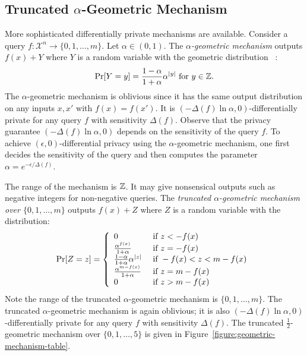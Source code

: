 \subsection{Truncated $\alpha$-Geometric Mechanism}\label{subsec:geometric}
More sophisticated differentially private mechanisms are
available. Consider a query
$f : \mathcal{X}^n \rightarrow \{ 0, 1, \ldots, m \}$. Let $\alpha \in (0, 1)$.
The \emph{$\alpha$-geometric mechanism}
outputs $f(x) + Y$ where $Y$ is a random variable with the geometric
distribution~\cite{GRS:09:UUPM,GRS:12:UUPM} :
\[
\Pr[Y = y] = \frac{1 - \alpha}{1 + \alpha}\alpha^{|y|}
\textmd{ for } y \in \mathbb{Z}.
\]
The $\alpha$-geometric mechanism is oblivious since it has the same
output distribution on any inputs $x, x'$ with $f (x) = f
(x')$. It is $(- {\Delta (f)} \ln \alpha, 0)$-differentially
private for any query $f$ with sensitivity $\Delta (f)$. Observe that
the privacy guarantee $(-{\Delta (f)} \ln \alpha, 0)$ depends on the
sensitivity of the query $f$. To achieve $(\epsilon, 0)$-differential
privacy using the $\alpha$-geometric mechanism, one first decides the
sensitivity of the query and then computes the parameter $\alpha =
e^{-{\epsilon}/{{\Delta (f)}}}$. 

The range of the mechanism is $\mathbb{Z}$. It may give nonsensical
outputs such as negative integers for non-negative queries.
The \emph{truncated $\alpha$-geometric mechanism over $\{ 0, 1,
  \ldots, m \}$}
outputs $f (x) + Z$ where $Z$ is a random variable with the 
distribution:
\[
\Pr[Z = z] =
\left\{
  \begin{array}{ll}
    0 & \textmd{ if } z < - f (x) \\
    \frac{\alpha^{f (x)}}{1 + \alpha} & \textmd{ if } z = -f (x)\\
    \frac{1 - \alpha}{1 + \alpha}\alpha^{|z|} &
    \textmd{ if } -f (x) < z < m - f (x)\\
    \frac{\alpha^{m - f (x)}}{1 + \alpha} & \textmd{ if } z = m-f (x)\\
    0 & \textmd{ if } z > m - f (x)
  \end{array}
\right.
\]
Note the range of the truncated $\alpha$-geometric mechanism is
$\{ 0, 1, \ldots, m \}$. The truncated $\alpha$-geometric mechanism is
again oblivious; it is also $(- {\Delta (f)} \ln \alpha, 0)$-differentially
private for any query $f$ with sensitivity $\Delta (f)$.
The truncated $\frac{1}{2}$-geometric mechanism over $\{ 0, 1, \ldots, 5 \}$ is
given in Figure~\ref{figure:geometric-mechanism-table}.

